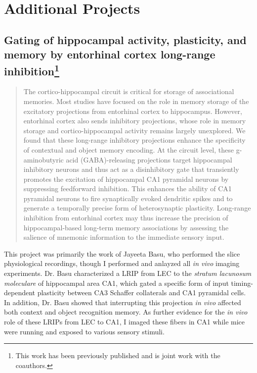 \acresetall
\chapter{Additional Projects}
\label{ch:other}


\section[Gating of hippocampal activity, plasticity, and memory by entorhinal cortex long-range inhibition]{Gating of hippocampal activity, plasticity, and memory by entorhinal cortex long-range inhibition\footnote{This work has been previously published \citep{Basu2016} and is joint work with the coauthors.}}
\label{sec:other:LRIP}

\begin{quote}
The cortico-hippocampal circuit is critical for storage of associational memories. Most studies have focused on the role in memory storage of the excitatory projections from entorhinal cortex to hippocampus. However, entorhinal cortex also sends inhibitory projections, whose role in memory storage and cortico-hippocampal activity remains largely unexplored. We found that these long-range inhibitory projections enhance the specificity of contextual and object memory encoding. At the circuit level, these g-aminobutyric acid (GABA)-releasing projections target hippocampal inhibitory neurons and thus act as a disinhibitory gate that transiently promotes the excitation of hippocampal CA1 pyramidal neurons by suppressing feedforward inhibition. This enhances the ability of CA1 pyramidal neurons to fire synaptically evoked dendritic spikes and to generate a temporally precise form of heterosynaptic plasticity. Long-range inhibition from entorhinal cortex may thus increase the precision of hippocampal-based long-term memory associations by assessing the salience of mnemonic information to the immediate sensory input.
\end{quote}

This project was primarily the work of Jayeeta Basu, who performed the slice physiological recordings, though I performed and anlayzed all \emph{in vivo} imaging experiments. Dr. Basu characterized a \ac{LRIP} from \ac{LEC} to the \emph{stratum lacunosum moleculare} of hippocampal area CA1, which gated a specific form of input timing-dependent plasticity between CA3 Schaffer collaterals and CA1 pyramidal cells. In addition, Dr. Basu showed that interrupting this projection \emph{in vivo} affected both context and object recognition memory. As further evidence for the \emph{in vivo} role of these LRIPs from LEC to CA1, I imaged these fibers in CA1 while mice were running and exposed to various sensory stimuli.


